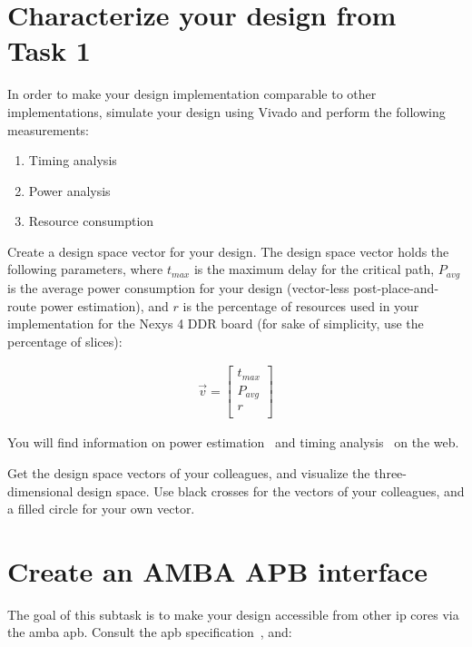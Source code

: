 \documentclass[%
	a4paper,
]
{article}
\begin{document}
\section{Characterize your design from Task 1}
\label{sec:characterization}

In order to make your design implementation comparable to other
implementations, simulate your design using Vivado and perform the
following measurements:

\begin{enumerate}

	\item{Timing analysis}

	\item{Power analysis}

	\item{Resource consumption}

\end{enumerate}

Create a design space vector for your design.%
The design space vector holds the following parameters, where $t_{max}$
is the maximum delay for the critical path, $P_{avg}$ is the average
power consumption for your design (vector-less post-place-and-route power
estimation), and $r$ is the percentage of resources used in your
implementation for the Nexys 4 DDR board (for sake of simplicity, use the
percentage of slices):

\begin{align}
	\vec{v} =
		\begin{bmatrix}
		t_{max}  \\
		P_{avg}\\
		r  \\
	\end{bmatrix}
\end{align}

You will find information on power estimation~\autocite{xpe} and timing
analysis~\autocite{timing} on the web.

Get the design space vectors of your colleagues, and visualize the
three-dimensional design space. Use black crosses for the vectors of your
colleagues, and a filled circle for your own vector.
%
%
\section{Create an AMBA APB interface}

The goal of this subtask is to make your design accessible from other
\gls{ip} cores via the \gls{amba} \gls{apb}. Consult the \gls{apb}
specification~\autocite{apb}, and:
\end{document}
